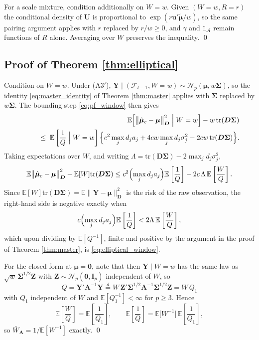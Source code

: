 \documentclass[pdflatex,sn-mathphys-num]{sn-jnl}%
\theoremstyle{thmstyleone}%
\theoremstyle{thmstyletwo}%
\theoremstyle{thmstylethree}%
\newcommand{\tr}{\mathrm{tr}}
\newcommand{\E}{\mathbb{E}}
\begin{document}
\begin{appendices}
For a scale mixture, condition additionally on $W=w$. Given $(W=w,R=r)$ the conditional density of $\bm U$ is proportional to $\exp(r\bm u'\widetilde{\bm\mu}/w)$, so the same pairing argument applies with $r$ replaced by $r/w\ge0$, and $\gamma$ and $\mathbb 1_{\mathcal A}$ remain functions of $R$ alone. Averaging over $W$ preserves the inequality. \qed

\subsection*{Proof of Theorem \ref{thm:elliptical}}

Condition on $W=w$. Under (A3$'$), $\bm Y\mid(\mathcal F_{t-1},W=w)\sim\mathcal N_p(\bm\mu,w\bm\Sigma)$, so the identity \eqref{eq:master_identity} of Theorem \ref{thm:master} applies with $\bm\Sigma$ replaced by $w\bm\Sigma$. The bounding step \eqref{eq:pf_window} then gives
\begin{eqnarray}
&&\E\Bigl[\bigl\|\hat{\bm\mu}_c-\bm\mu\bigr\|^2_{\bm D}\Bigm| W=w\Bigr]-w\,\tr(\bm D\bm\Sigma)
\cr
&&\qquad\le\;
\E\left[\frac1Q\Bigm| W=w\right]
\Bigl\{
c^{2}\max_j d_ja_j+4cw\max_jd_j\sigma^2_j-2cw\,\tr(\bm D\bm\Sigma)
\Bigr\}.
\end{eqnarray}
Taking expectations over $W$, and writing $\Lambda=\tr(\bm D\bm\Sigma)-2\max_jd_j\sigma^2_j$,
\begin{equation}
\E\bigl\|\hat{\bm\mu}_c-\bm\mu\bigr\|^2_{\bm D}-\E[W]\tr(\bm D\bm\Sigma)
\le
c^{2}\Bigl(\max_jd_ja_j\Bigr)\E\left[\frac1Q\right]
-2c\,\Lambda\,\E\left[\frac{W}{Q}\right].
\end{equation}
Since $\E[W]\tr(\bm D\bm\Sigma)=\E\|\bm Y-\bm\mu\|^2_{\bm D}$ is the risk of the raw observation, the right-hand side is negative exactly when
\begin{equation}
c\Bigl(\max_jd_ja_j\Bigr)\E\left[\frac1Q\right]<2\Lambda\,\E\left[\frac WQ\right],
\end{equation}
which upon dividing by $\E[Q^{-1}]$, finite and positive by the argument in the proof of Theorem \ref{thm:master}, is \eqref{eq:elliptical_window}.

For the closed form at $\bm\mu=\bm 0$, note that then $\bm Y\mid W=w$ has the same law as $\sqrt w\,\bm\Sigma^{1/2}\bm Z$ with $\bm Z\sim\mathcal N_p(\bm 0,\bm I_p)$ independent of $W$, so
\begin{equation}
Q=\bm Y'\bm A^{-1}\bm Y
\stackrel{d}{=}
W\,\bm Z'\bm\Sigma^{1/2}\bm A^{-1}\bm\Sigma^{1/2}\bm Z
=W\,Q_1
\end{equation}
with $Q_1$ independent of $W$ and $\E[Q_1^{-1}]<\infty$ for $p\ge3$. Hence
\begin{equation}
\E\left[\frac WQ\right]=\E\left[\frac{1}{Q_1}\right],
\qquad
\E\left[\frac 1Q\right]=\E\bigl[W^{-1}\bigr]\,\E\left[\frac{1}{Q_1}\right],
\end{equation}
so $\bar W_{\bm A}=1/\E[W^{-1}]$ exactly. \qed


\end{appendices}
\end{document}
